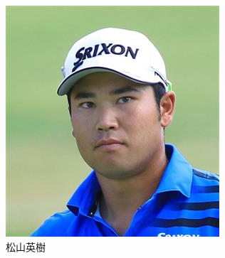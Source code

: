 \documentclass[a4j, twocolumn]{jarticle}
\begin{document}
\begin{figure}[htb]
  \centering
    \begin{subfigure}{0.30\linewidth}
      \includegraphics[width=\linewidth]{matuyama.jpg}
      \caption{松山英樹}\label{matsuyama}
    \end{subfigure}
    \hspace{0.04\linewidth}
    \begin{subfigure}{0.25\linewidth}

\end{subfigure}
\end{figure}
\end{document}
